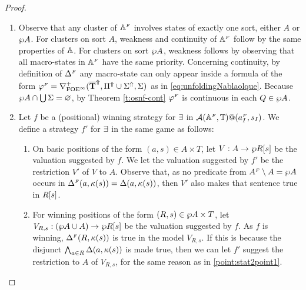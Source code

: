 \begin{proof}
\begin{enumerate}[(1)]
\item
Observe that any cluster of $\mathbb{A}^{{\scriptscriptstyle F}}$ involves states of exactly one sort,
either $A$ or $\wp A$.
For clusters on sort $A$, weakness and continuity of $\mathbb{A}^{{\scriptscriptstyle F}}$ follow by 
the same properties of $\mathbb{A}$.
For clusters on sort $\wp A$, weakness follows by observing that all macro-states
in $\mathbb{A}^{{\scriptscriptstyle F}}$ have the same priority.
Concerning continuity, by definition of $\Delta^{{\scriptscriptstyle F}}$ any macro-state can only
appear inside a formula of the form $\varphi^{{\scriptscriptstyle F}} =
\nabla^+_{\mathrm{FOE}^{\infty}}(\overline{{\mathbf{T}}}^{\Uparrow},\Pi^{\Uparrow} \cup \Sigma^{\Uparrow},\Sigma)$ as in
\eqref{eq:unfoldingNablaolque}.
Because $\wp A \cap \bigcup\Sigma = \varnothing$, by Theorem \ref{t:osnf-cont}
$\varphi^{{\scriptscriptstyle F}}$ is continuous in each $Q \in \wp A$.

\item
Let $f$ be a (positional) winning strategy for $\exists$ in $\mathcal{A}
(\mathbb{A}^{{\scriptscriptstyle F}},\mathbb{T})@(a_I^{{\scriptscriptstyle F}},s_I)$.
We define a strategy $f'$ for $\exists$ in the same game as follows:
\begin{enumerate}[label=(\alph*),ref=\alph*]
\item 
\label{point:stat2point1}
On basic positions of the form $(a,s) \in A\times T$, let $V: A \to \wp R[s]$
be the valuation suggested by $f$.
We let the valuation suggested by $f'$ be the restriction $V'$ of $V$ to $A$.
Observe that, as no predicate from $A^{{\scriptscriptstyle F}}\setminus A =\wp A$ occurs in
$\Delta^{{\scriptscriptstyle F}}(a,\kappa(s)) = \Delta(a,\kappa(s))$, then $V'$ also makes that sentence
true in $R[s]$.

\item
For winning positions of the form $(R,s) \in \wp A \times T$, let $V_{R,s}: 
(\wp A \cup A) \to \wp R[s]$ be the valuation suggested by $f$.
As $f$ is winning, $\Delta^{{\scriptscriptstyle F}}(R,\kappa(s))$ is true in the model $V_{R,s}$.
If this is because the disjunct $\bigwedge_{a \in R} \Delta(a,\kappa(s))$ is made
true, then we can let $f'$ suggest the restriction to $A$ of $V_{R,s}$,
for the same reason as in \eqref{point:stat2point1}.
  

\end{enumerate}
\end{enumerate}
\end{proof}
